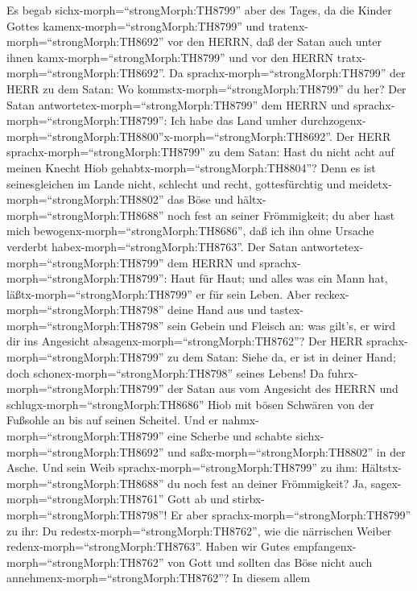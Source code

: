  Es begab sichx-morph=``strongMorph:TH8799'' aber des Tages,
da die Kinder Gottes kamenx-morph=``strongMorph:TH8799'' und
tratenx-morph=``strongMorph:TH8692'' vor den HERRN, daß der Satan auch
unter ihnen kamx-morph=``strongMorph:TH8799'' und vor den HERRN
tratx-morph=``strongMorph:TH8692''.  Da
sprachx-morph=``strongMorph:TH8799'' der HERR zu dem Satan: Wo
kommstx-morph=``strongMorph:TH8799'' du her? Der Satan
antwortetex-morph=``strongMorph:TH8799'' dem HERRN und
sprachx-morph=``strongMorph:TH8799'': Ich habe das Land umher
durchzogenx-morph=``strongMorph:TH8800''x-morph=``strongMorph:TH8692''.
 Der HERR sprachx-morph=``strongMorph:TH8799'' zu dem Satan:
Hast du nicht acht auf meinen Knecht Hiob
gehabtx-morph=``strongMorph:TH8804''? Denn es ist seinesgleichen im
Lande nicht, schlecht und recht, gottesfürchtig und
meidetx-morph=``strongMorph:TH8802'' das Böse und
hältx-morph=``strongMorph:TH8688'' noch fest an seiner Frömmigkeit; du
aber hast mich bewogenx-morph=``strongMorph:TH8686'', daß ich ihn ohne
Ursache verderbt habex-morph=``strongMorph:TH8763''.  Der
Satan antwortetex-morph=``strongMorph:TH8799'' dem HERRN und
sprachx-morph=``strongMorph:TH8799'': Haut für Haut; und alles was ein
Mann hat, läßtx-morph=``strongMorph:TH8799'' er für sein Leben.
 Aber reckex-morph=``strongMorph:TH8798'' deine Hand aus und
tastex-morph=``strongMorph:TH8798'' sein Gebein und Fleisch an: was
gilt's, er wird dir ins Angesicht absagenx-morph=``strongMorph:TH8762''?
 Der HERR sprachx-morph=``strongMorph:TH8799'' zu dem Satan:
Siehe da, er ist in deiner Hand; doch
schonex-morph=``strongMorph:TH8798'' seines Lebens!  Da
fuhrx-morph=``strongMorph:TH8799'' der Satan aus vom Angesicht des HERRN
und schlugx-morph=``strongMorph:TH8686'' Hiob mit bösen Schwären von der
Fußsohle an bis auf seinen Scheitel.  Und er
nahmx-morph=``strongMorph:TH8799'' eine Scherbe und schabte
sichx-morph=``strongMorph:TH8692'' und saßx-morph=``strongMorph:TH8802''
in der Asche.  Und sein Weib
sprachx-morph=``strongMorph:TH8799'' zu ihm:
Hältstx-morph=``strongMorph:TH8688'' du noch fest an deiner Frömmigkeit?
Ja, sagex-morph=``strongMorph:TH8761'' Gott ab und
stirbx-morph=``strongMorph:TH8798''!  Er aber
sprachx-morph=``strongMorph:TH8799'' zu ihr: Du
redestx-morph=``strongMorph:TH8762'', wie die närrischen Weiber
redenx-morph=``strongMorph:TH8763''. Haben wir Gutes
empfangenx-morph=``strongMorph:TH8762'' von Gott und sollten das Böse
nicht auch annehmenx-morph=``strongMorph:TH8762''? In diesem allem
